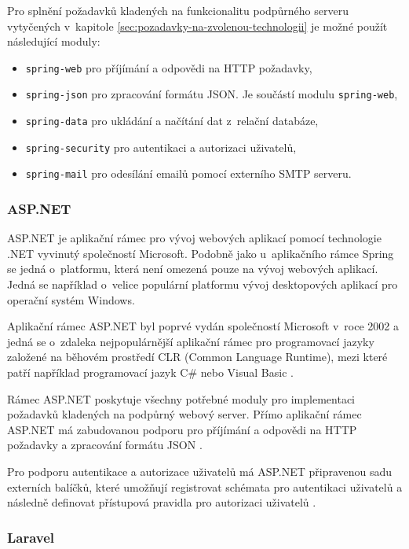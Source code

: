Pro splnění požadavků kladených na funkcionalitu podpůrného serveru vytyčených v~kapitole \ref{sec:pozadavky-na-zvolenou-technologii} je možné použít následující moduly:

\begin{itemize}
    \item \verb|spring-web| pro příjímání a odpovědi na HTTP požadavky,
    \item \verb|spring-json| pro zpracování formátu JSON. Je součástí modulu \verb|spring-web|,
    \item \verb|spring-data| pro ukládání a načítání dat z~relační databáze,
    \item \verb|spring-security| pro autentikaci a autorizaci uživatelů,
    \item \verb|spring-mail| pro odesílání emailů pomocí externího SMTP serveru.
\end{itemize}

\subsubsection{ASP.NET}

ASP.NET je aplikační rámec pro vývoj webových aplikací pomocí technologie .NET vyvinutý společností Microsoft. Podobně jako u~aplikačního rámce Spring se jedná o~platformu, která není omezená pouze na vývoj webových aplikací. Jedná se například o~velice populární platformu vývoj desktopových aplikací pro operační systém Windows.

Aplikační rámec ASP.NET byl poprvé vydán společností Microsoft v~roce 2002 \cite{bekker_microsoft_2002} a jedná se o~zdaleka nejpopulárnější aplikační rámec pro programovací jazyky založené na běhovém prostředí CLR (Common Language Runtime), mezi které patří například programovací jazyk C\# nebo Visual Basic \cite{warren_clr_2022}.

Rámec ASP.NET poskytuje všechny potřebné moduly pro implementaci požadavků kladených na podpůrný webový server. Přímo aplikační rámec ASP.NET má zabudovanou podporu pro příjímání a odpovědi na HTTP požadavky a zpracování formátu JSON \cite{dotnet_web_2023}.

Pro podporu autentikace a autorizace uživatelů má ASP.NET připravenou sadu externích balíčků, které umožňují registrovat schémata pro autentikaci uživatelů a následně definovat přístupová pravidla pro autorizaci uživatelů \cite{dotnet_security_2022}.

\subsubsection{Laravel}

